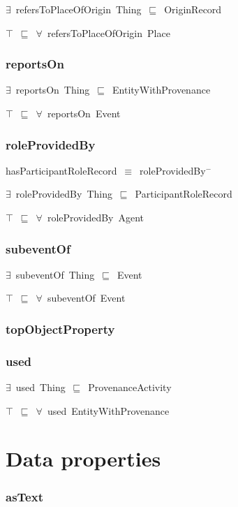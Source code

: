 \documentclass{article}
\begin{document}
\ensuremath{\exists}~refersToPlaceOfOrigin~Thing~\ensuremath{\sqsubseteq}~OriginRecord

\ensuremath{\top}~\ensuremath{\sqsubseteq}~\ensuremath{\forall}~refersToPlaceOfOrigin~Place

\subsubsection*{reportsOn}

\ensuremath{\exists}~reportsOn~Thing~\ensuremath{\sqsubseteq}~EntityWithProvenance

\ensuremath{\top}~\ensuremath{\sqsubseteq}~\ensuremath{\forall}~reportsOn~Event

\subsubsection*{roleProvidedBy}

hasParticipantRoleRecord~\ensuremath{\equiv}~roleProvidedBy\ensuremath{^-}

\ensuremath{\exists}~roleProvidedBy~Thing~\ensuremath{\sqsubseteq}~ParticipantRoleRecord

\ensuremath{\top}~\ensuremath{\sqsubseteq}~\ensuremath{\forall}~roleProvidedBy~Agent

\subsubsection*{subeventOf}

\ensuremath{\exists}~subeventOf~Thing~\ensuremath{\sqsubseteq}~Event

\ensuremath{\top}~\ensuremath{\sqsubseteq}~\ensuremath{\forall}~subeventOf~Event

\subsubsection*{topObjectProperty}

\subsubsection*{used}

\ensuremath{\exists}~used~Thing~\ensuremath{\sqsubseteq}~ProvenanceActivity

\ensuremath{\top}~\ensuremath{\sqsubseteq}~\ensuremath{\forall}~used~EntityWithProvenance

\section*{Data properties}\subsubsection*{asText}
\end{document}
